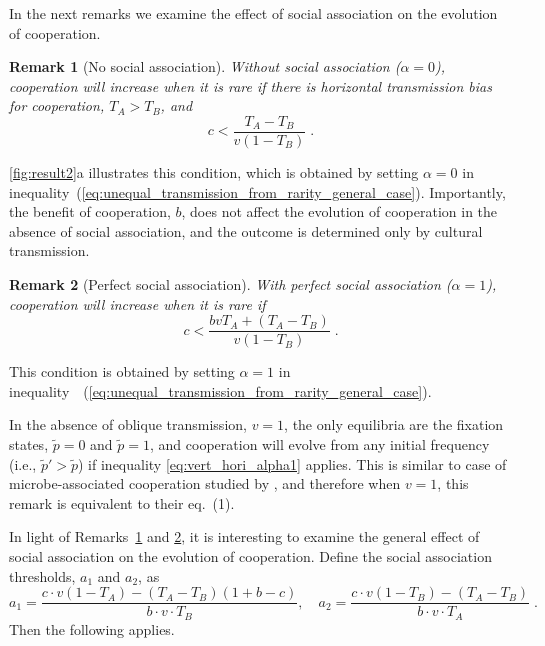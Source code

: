 \documentclass[12pt]{extarticle}
\newtheorem{remark}{Remark}
\begin{document}
In the next remarks we examine the effect of social association on the evolution of cooperation.
\\

\begin{remark}[No social association]
\label{remark:alpha0}
Without social association ($\alpha=0$), cooperation will increase when it is rare if there is horizontal transmission bias for cooperation, $T_A>T_B$, and
\begin{equation}
\label{eq:vert_hori_alpha0}
c < \frac{T_A - T_B}{v(1-T_B)} \;.
\end{equation}
\end{remark}

\autoref{fig:result2}a illustrates this condition, which is obtained by setting $\alpha=0$ in inequality~(\ref{eq:unequal_transmission_from_rarity_general_case}).
Importantly, the benefit of cooperation, $b$, does not affect the evolution of cooperation in the absence of social association, and the outcome is determined only by  cultural transmission.
\\

\begin{remark}[Perfect social association]
\label{remark:alpha1}
With perfect social association ($\alpha=1$), cooperation will increase when it is rare if
\begin{equation}\label{eq:vert_hori_alpha1}
c < \frac{b v T_A + (T_A - T_B)}{v(1-T_B)} \;.
\end{equation}
\end{remark}
This condition is obtained by setting $\alpha=1$ in inequality~\ (\ref{eq:unequal_transmission_from_rarity_general_case}).

In the absence of oblique transmission, $v=1$, the only equilibria are the fixation states, $\tilde{p}=0$ and $\tilde{p}=1$, and cooperation will evolve from any initial frequency (i.e., $\tilde{p}'>\tilde{p}$) if inequality \ref{eq:vert_hori_alpha1} applies.
This is similar to case of microbe-associated cooperation studied by \citet{lewin2017microbes}, and therefore when $v=1$, this remark is equivalent to their eq.~(1).

In light of Remarks~\ref{remark:alpha0} and \ref{remark:alpha1}, it is interesting to examine the general effect of social association on the evolution of cooperation.
Define the social association thresholds, $a_1$ and $a_2$, as 
\begin{equation} \label{eq:boundries_assortative_meeting_general_case}
  a_1 = \frac{c\cdot v(1-T_A) -(T_A-T_B)(1+b-c)}{b\cdot v \cdot T_B}, \quad
  a_2 = \frac{c\cdot v(1-T_B)-(T_A-T_B)}{b\cdot v\cdot T_A} \;.
\end{equation}
Then the following applies.
\\
\end{document}
